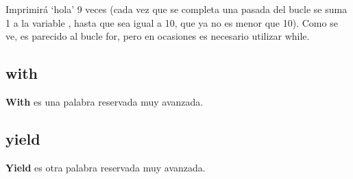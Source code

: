 
Imprimirá `hola' 9 veces (cada vez que se completa una pasada del bucle se suma 1 a la variable , hasta que  sea igual a 10, que ya no es menor que 10). Como se ve, es parecido al bucle for, pero en ocasiones es necesario utilizar while.

\subsection*{with}

\textbf{With} es una palabra reservada muy avanzada.

\subsection*{yield}
\textbf{Yield} es otra palabra reservada muy avanzada.

\newpage
